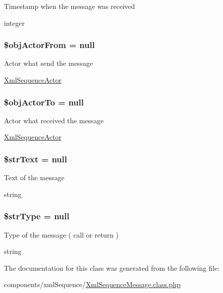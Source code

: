 Timestamp when the message was received

integer \hypertarget{class_xml_sequence_message_e9dd3763377b6dc6e6d6a6d3d8251d7a}{
\subsubsection[{\$objActorFrom}]{\setlength{\rightskip}{0pt plus 5cm}\$objActorFrom = null}}
\label{class_xml_sequence_message_e9dd3763377b6dc6e6d6a6d3d8251d7a}


Actor what send the message

\hyperlink{class_xml_sequence_actor}{XmlSequenceActor} \hypertarget{class_xml_sequence_message_8e20973ff6f3a2e22915b6e1bc7b528d}{
\subsubsection[{\$objActorTo}]{\setlength{\rightskip}{0pt plus 5cm}\$objActorTo = null}}
\label{class_xml_sequence_message_8e20973ff6f3a2e22915b6e1bc7b528d}


Actor what received the message

\hyperlink{class_xml_sequence_actor}{XmlSequenceActor} \hypertarget{class_xml_sequence_message_e870578cac1ab9406d8fd471df9d8f98}{
\subsubsection[{\$strText}]{\setlength{\rightskip}{0pt plus 5cm}\$strText = null}}
\label{class_xml_sequence_message_e870578cac1ab9406d8fd471df9d8f98}


Text of the message

string \hypertarget{class_xml_sequence_message_ac9a08cb422ab9a398d451299b054e28}{
\subsubsection[{\$strType}]{\setlength{\rightskip}{0pt plus 5cm}\$strType = null}}
\label{class_xml_sequence_message_ac9a08cb422ab9a398d451299b054e28}


Type of the message ( call or return )

string 

The documentation for this class was generated from the following file:\begin{CompactItemize}
\item 
components/xmlSequence/\hyperlink{_xml_sequence_message_8class_8php}{XmlSequenceMessage.class.php}\end{CompactItemize}
